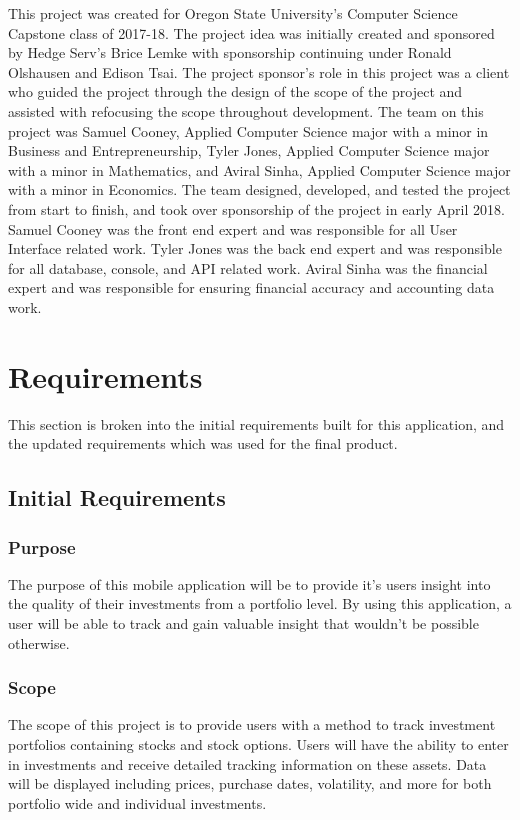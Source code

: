 \documentclass[onecolumn, draftclsnofoot,10pt, compsoc]{IEEEtran}
\begin{document}
This project was created for Oregon State University's Computer Science Capstone class of 2017-18. The project idea was initially
created and sponsored by Hedge Serv's Brice Lemke with sponsorship continuing under Ronald Olshausen and Edison Tsai. The project sponsor's role
in  this project was a client who guided the project through the design of the scope of the project and assisted with
refocusing the scope throughout development. The team on this project was Samuel Cooney, Applied Computer Science
major with a minor in Business and Entrepreneurship, Tyler Jones, Applied Computer Science major with a minor in Mathematics, and Aviral Sinha, Applied Computer Science major with a minor in Economics.
The team designed, developed, and tested the project from start to finish, and took over sponsorship of the project in early April 2018.
Samuel Cooney was the front end expert and was responsible for all User Interface related work. Tyler Jones was the back end expert and was
responsible for all database, console, and API related work. Aviral Sinha was the financial expert and was responsible for ensuring financial
accuracy and accounting data work. 

\section{Requirements}
This section is broken into the initial requirements built for this application, and the updated requirements which was used for the final product.
\subsection{Initial Requirements}
\subsubsection{Purpose}
The purpose of this mobile application will be to provide it's users insight into the quality of their investments from a portfolio level. 
By using this application, a user will be able to track and gain valuable insight that wouldn't be possible otherwise.

\subsubsection{Scope}
The scope  of this project is to provide users with a method to track investment portfolios containing stocks and stock options. Users will have
the ability  to enter in investments and receive detailed tracking information on these assets. Data will be displayed including prices, purchase
dates, volatility, and more for both portfolio wide and individual investments.
\end{document}
